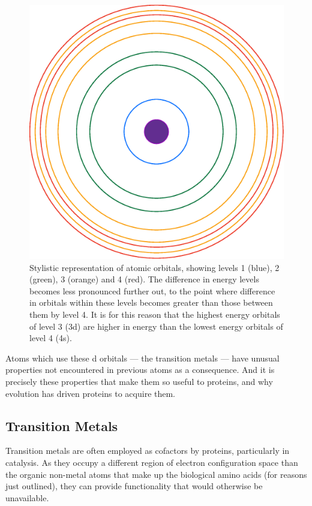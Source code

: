 \begin{figure}
\centering
\includegraphics[width=1.0\textwidth]{Figures/orbitals.eps}
\caption{\label{fig:orbitals} Stylistic representation of atomic orbitals, showing levels 1 (blue), 2 (green), 3 (orange) and 4 (red). The difference in energy levels becomes less pronounced further out, to the point where difference in orbitals within these levels becomes greater than those between them by level 4. It is for this reason that the highest energy orbitals of level 3 (3d) are higher in energy than the lowest energy orbitals of level 4 (4s).}
\end{figure}

Atoms which use these d orbitals --- the transition metals --- have unusual properties not encountered in previous atoms as a consequence. And it is precisely these properties that make them so useful to proteins, and why evolution has driven proteins to acquire them.

\subsection{Transition Metals}

Transition metals are often employed as cofactors by proteins, particularly in catalysis. As they occupy a different region of electron configuration space than the organic non-metal atoms that make up the biological amino acids (for reasons just outlined), they can provide functionality that would otherwise be unavailable.

